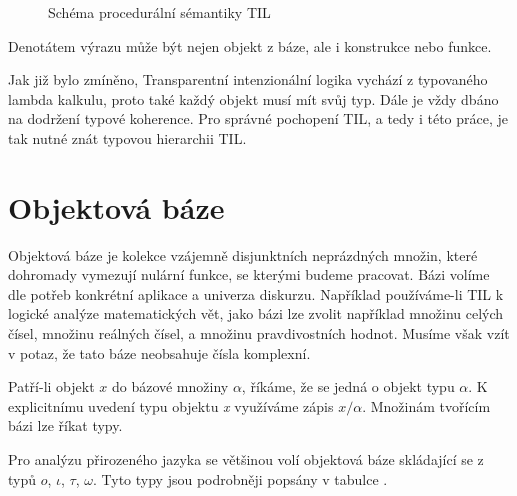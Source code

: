 \begin{figure}
    \centering
    \caption{Schéma procedurální sémantiky TIL}\label{fig:til-semantics}
\end{figure}

Denotátem výrazu může být nejen objekt z báze, ale i konstrukce nebo funkce.

Jak již bylo zmíněno, Transparentní intenzionální logika vychází z typovaného lambda kalkulu, proto
také každý objekt musí mít svůj typ. Dále je vždy dbáno na dodržení typové koherence. Pro správné
pochopení TIL, a tedy i této práce, je tak nutné znát typovou hierarchii TIL.

\section{Objektová báze}

Objektová báze je kolekce vzájemně disjunktních neprázdných množin, které dohromady vymezují
nulární funkce, se kterými budeme pracovat\cite{til-duzi}. Bázi volíme dle potřeb konkrétní aplikace
a univerza diskurzu. Například používáme-li TIL k logické analýze matematických vět, jako bázi lze
zvolit například množinu celých čísel, množinu reálných čísel, a množinu pravdivostních hodnot.
Musíme však vzít v potaz, že tato báze neobsahuje čísla komplexní.

Patří-li objekt $x$ do bázové množiny $\alpha$, říkáme, že se jedná o objekt typu $\alpha$.
K explicitnímu uvedení typu objektu \textit{x} využíváme zápis $x/\alpha$. Množinám tvořícím bázi
lze říkat typy.

Pro analýzu přirozeného jazyka se většinou volí objektová báze skládající se z typů {$o$, $\iota$,
$\tau$, $\omega$}. Tyto typy jsou podrobněji popsány v tabulce .

